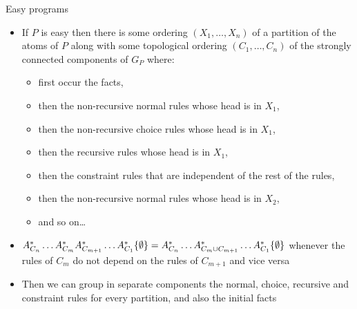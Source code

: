 \begin{frame}{Easy programs}
  \begin{itemize}
    \item If $P$ is easy then there is 
          some ordering $(X_1, \ldots, X_n)$ of a partition of the atoms of $P$ along with
          some topological ordering
          $(C_1, \ldots, C_n)$ of the strongly connected components of $G_P$
          where:
    \begin{itemize}
      \item first occur the facts, 
      \item then the non-recursive normal rules whose head is in $X_1$, 
      \item then the non-recursive choice rules whose head is in $X_1$, 
      \item then the recursive rules whose head is in $X_1$, 
      \item then the constraint rules that are independent of the rest of the rules,
      \item then the non-recursive normal rules whose head is in $X_2$, 
      \item and so on\ldots
    \end{itemize}
      \item $A_{C_n}^{*}\ldots A_{C_m}^{*}A_{C_{m+1}}^{*}\ldots A_{C_1}^{*}\{\emptyset\} =
             A_{C_n}^{*}\ldots A_{C_m \cup C_{m+1}}^{*}\ldots A_{C_1}^{*}\{\emptyset\}$ whenever 
            the rules of $C_m$ do not depend on the rules of $C_{m+1}$ and vice versa
    \item Then we can group in separate components
          the normal, choice, recursive  and constraint rules for every partition, and also the initial facts
  \end{itemize}
\end{frame}

